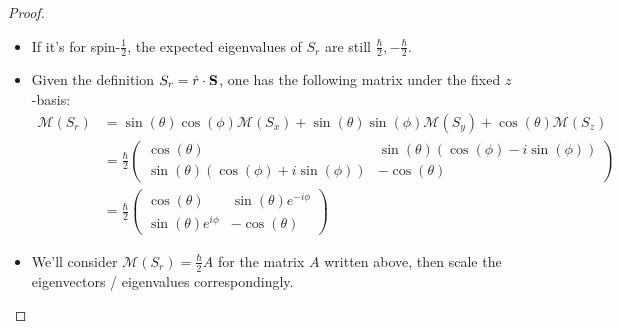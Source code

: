 \documentclass{article}
\begin{document}
\begin{proof}

    \hfil

    \begin{itemize}
        \item[(a)] If it's for spin-$\frac{1}{2}$, the expected eigenvalues of $S_r$ are still $\frac{\hbar}{2},-\frac{\hbar}{2}$.
        
        \hfil

        \item[(b)] Given the definition $S_r = \hat{r}\cdot \mathbf{S}$, one has the following matrix under the fixed $z$-basis:
        \begin{align}
            \mathcal{M}(S_r) &= \sin(\theta)\cos(\phi)\mathcal{M}(S_x)+\sin(\theta)\sin(\phi)\mathcal{M}(S_y)+\cos(\theta)\mathcal{M}(S_z)\\ 
            &= \frac{\hbar}{2}\begin{pmatrix}
                \cos(\theta)&\sin(\theta)(\cos(\phi)-i\sin(\phi))\\
                \sin(\theta)(\cos(\phi)+i\sin(\phi))&-\cos(\theta)
            \end{pmatrix}\\
            &= \frac{\hbar}{2}\begin{pmatrix}
                \cos(\theta) & \sin(\theta)e^{-i\phi}\\
                \sin(\theta)e^{i\phi} & -\cos(\theta)
            \end{pmatrix}
        \end{align}

        \hfil

        \item[(c)] We'll consider $\mathcal{M}(S_r) = \frac{\hbar}{2}A$ for the matrix $A$ written above, then scale the eigenvectors / eigenvalues correspondingly.
        

\end{itemize}
\end{proof}
\end{document}
